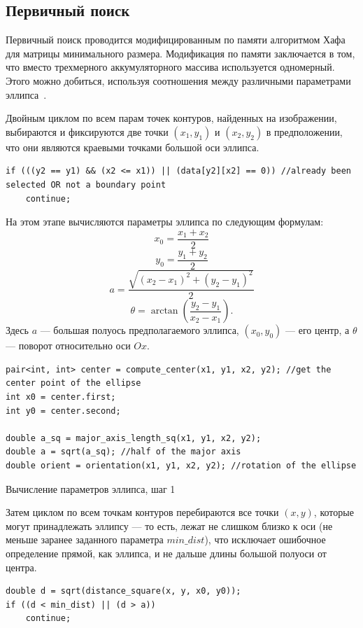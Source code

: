 \subsection{Первичный поиск}
Первичный поиск проводится модифицированным по памяти алгоритмом Хафа для матрицы минимального размера.
Модификация по памяти заключается в том, что вместо трехмерного аккумуляторного массива используется одномерный.
Этого можно добиться, используя соотношения между различными параметрами эллипса~\autocite{OneDim}.

Двойным циклом по всем парам точек контуров, найденных на изображении, выбираются и фиксируются две точки \((x_1, y_1)\) и \((x_2, y_2)\) в предположении, что они являются краевыми точками большой оси эллипса.

\begin{lstlisting}
if (((y2 == y1) && (x2 <= x1)) || (data[y2][x2] == 0)) //already been selected OR not a boundary point
    continue;
\end{lstlisting}

На этом этапе вычисляются параметры эллипса по следующим формулам:
$$x_0 = \frac{x_1 + x_2}{2}$$
$$y_0 = \frac{y_1 + y_2}{2}$$
$$a = \frac{\sqrt{(x_2 - x_1)^2 + (y_2 - y_1)^2}}{2}$$
$$\theta = \arctan(\frac{y_2 - y_1}{x_2 - x_1}).$$
Здесь \(a\) --- большая полуось предполагаемого эллипса, \((x_0, y_0)\) --- его центр, а \(\theta\) --- поворот относительно оси \(Ox\).

\begin{ListingEnv}[H]
\begin{lstlisting}
pair<int, int> center = compute_center(x1, y1, x2, y2); //get the center point of the ellipse
int x0 = center.first;
int y0 = center.second;

double a_sq = major_axis_length_sq(x1, y1, x2, y2);
double a = sqrt(a_sq); //half of the major axis
double orient = orientation(x1, y1, x2, y2); //rotation of the ellipse
\end{lstlisting}
\caption{Вычисление параметров эллипса, шаг 1}
\label{list:majoraxis}
\end{ListingEnv}

Затем циклом по всем точкам контуров перебираются все точки \((x,y)\), которые могут принадлежать эллипсу --- то есть, лежат не слишком близко к оси (не меньше заранее заданного параметра \(min\_dist\)), 
что исключает ошибочное определение прямой, как эллипса, и не дальше длины большой полуоси от центра.

\begin{lstlisting}
double d = sqrt(distance_square(x, y, x0, y0));
if ((d < min_dist) || (d > a))
    continue;
\end{lstlisting}

